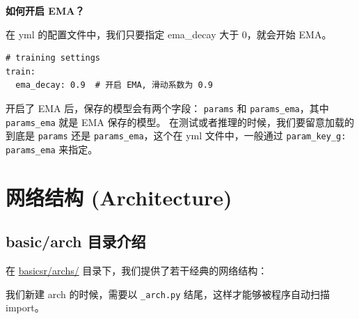 \documentclass[../main.tex]{subfiles}
\begin{document}
\begin{hl} %
    \textbf{如何开启 EMA？}

    在 yml 的配置文件中，我们只要指定 ema\_decay 大于 0，就会开始 EMA。
    \begin{verbatim}
# training settings
train:
  ema_decay: 0.9  # 开启 EMA, 滑动系数为 0.9
\end{verbatim}
\end{hl}

开启了 EMA 后，保存的模型会有两个字段： \texttt{params} 和 \texttt{params\_ema}，其中  \texttt{params\_ema} 就是 EMA 保存的模型。
在测试或者推理的时候，我们要留意加载的到底是 \texttt{params} 还是 \texttt{params\_ema}，这个在 yml 文件中，一般通过  \texttt{param\_key\_g: params\_ema} 来指定。

\section{网络结构 (Architecture)} \label{code_structure:arch}

\subsection{basic/arch 目录介绍}\label{code_structure:arch_contents}

在 \href{https://github.com/XPixelGroup/BasicSR/tree/master/basicsr/archs}{basicsr/archs/} 目录下，我们提供了若干经典的网络结构：

\vspace{0.5cm}
\renewcommand*\DTstyle{\ttfamily\textcolor{black}}
\vspace{0.5cm}

\begin{hl} %
    我们新建 arch 的时候，需要以 \texttt{\_arch.py} 结尾，这样才能够被程序自动扫描 import。
\end{hl}
\end{document}
